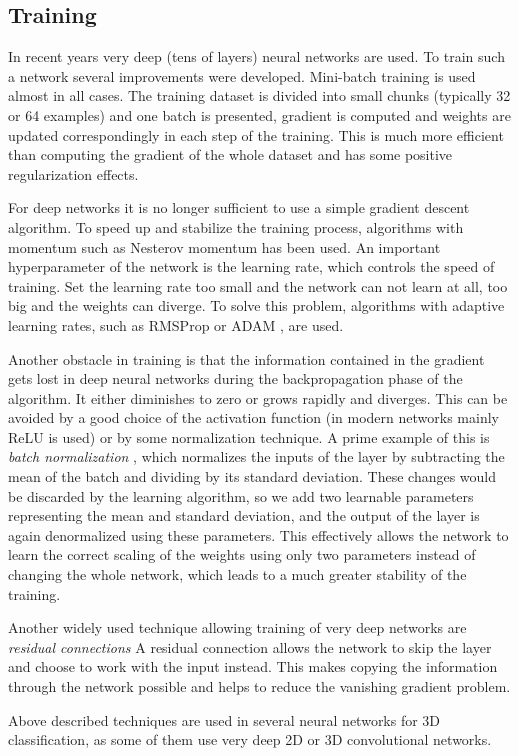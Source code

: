 \subsection{Training}
\label{sec:training}
In recent years very deep (tens of layers) neural networks are used. To train such a network several improvements were developed. Mini-batch training is used almost in all cases. The training dataset is divided into small chunks (typically 32 or 64 examples) and one batch is presented, gradient is computed and weights are updated correspondingly in each step of the training. This is much more efficient than computing the gradient of the whole dataset and has some positive regularization effects. \par
For deep networks it is no longer sufficient to use a simple gradient descent algorithm. To speed up and stabilize the training process, algorithms with momentum such as Nesterov momentum \cite{sutskever_importance_2013} has been used. An important hyperparameter of the network is the learning rate, which controls the speed of training. Set the learning rate too small and the network can not learn at all, too big and the weights can diverge. To solve this problem, algorithms with adaptive learning rates, such as 
RMSProp \cite{hinton_neural_nodate} or ADAM \cite{kingma_adam:_2014}, are used. \par
Another obstacle in training is that the information contained in the gradient gets lost in deep neural networks during the backpropagation phase of the algorithm. It either diminishes to zero or grows rapidly and diverges. This can be avoided by a good choice of the activation function (in modern networks mainly ReLU is used) or by some normalization technique. A prime example of this is \textit{batch normalization} \cite{ioffe_batch_2015}, which normalizes the inputs of the layer by subtracting the mean of the batch and dividing by its standard deviation. These changes would be discarded by the learning algorithm, so we add two learnable parameters representing the mean and standard deviation, and the output of the layer is again denormalized using these parameters. This effectively allows the network to learn the correct scaling of the weights using only two parameters instead of changing the whole network, which leads to a much greater stability of the training.\par
Another widely used technique allowing training of very deep networks are \textit{residual connections} \cite{szegedy_inception-v4_2016} A residual connection allows the network to skip the layer and choose to work with the input instead. This makes copying the information through the network possible and helps to reduce the vanishing gradient problem. \par
Above described techniques are used in several neural networks for 3D classification, as some of them use very deep 2D or 3D convolutional networks.

